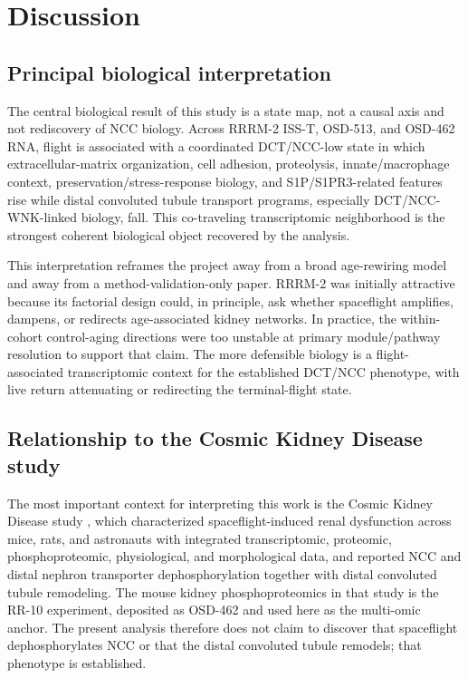 \documentclass[11pt]{article}
\begin{document}
\section{Discussion}

\subsection{Principal biological interpretation}

The central biological result of this study is a state map, not a causal axis and not rediscovery of NCC biology. Across RRRM-2 ISS-T, OSD-513, and OSD-462 RNA, flight is associated with a coordinated DCT/NCC-low state in which extracellular-matrix organization, cell adhesion, proteolysis, innate/macrophage context, preservation/stress-response biology, and S1P/S1PR3-related features rise while distal convoluted tubule transport programs, especially DCT/NCC-WNK-linked biology, fall. This co-traveling transcriptomic neighborhood is the strongest coherent biological object recovered by the analysis.

This interpretation reframes the project away from a broad age-rewiring model and away from a method-validation-only paper. RRRM-2 was initially attractive because its factorial design could, in principle, ask whether spaceflight amplifies, dampens, or redirects age-associated kidney networks. In practice, the within-cohort control-aging directions were too unstable at primary module/pathway resolution to support that claim. The more defensible biology is a flight-associated transcriptomic context for the established DCT/NCC phenotype, with live return attenuating or redirecting the terminal-flight state.

\subsection{Relationship to the Cosmic Kidney Disease study}

The most important context for interpreting this work is the Cosmic Kidney Disease study \citep{siew2024cosmic}, which characterized spaceflight-induced renal dysfunction across mice, rats, and astronauts with integrated transcriptomic, proteomic, phosphoproteomic, physiological, and morphological data, and reported NCC and distal nephron transporter dephosphorylation together with distal convoluted tubule remodeling. The mouse kidney phosphoproteomics in that study is the RR-10 experiment, deposited as OSD-462 and used here as the multi-omic anchor. The present analysis therefore does not claim to discover that spaceflight dephosphorylates NCC or that the distal convoluted tubule remodels; that phenotype is established.
\end{document}
